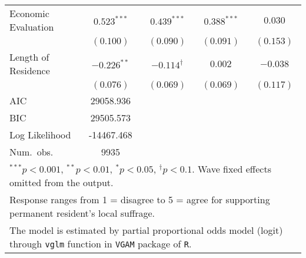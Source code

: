 \begin{table}
\begin{center}
\begin{tabular}{l c c c c }
Economic Evaluation    & $0.523^{***}$  & $0.439^{***}$      & $0.388^{***}$  & $0.030$            \\
                       & $(0.100)$      & $(0.090)$          & $(0.091)$      & $(0.153)$          \\
Length of Residence    & $-0.226^{**}$  & $-0.114^{\dagger}$ & $0.002$        & $-0.038$           \\
                       & $(0.076)$      & $(0.069)$          & $(0.069)$      & $(0.117)$          \\
\midrule
AIC                    & 29058.936      &                    &                &                    \\
BIC                    & 29505.573      &                    &                &                    \\
Log Likelihood         & -14467.468     &                    &                &                    \\
Num.\ obs.             & 9935           &                    &                &                    \\
\bottomrule
\multicolumn{5}{l}{\scriptsize{$^{***}p<0.001$, $^{**}p<0.01$, $^*p<0.05$, $^{\dagger}p<0.1$. Wave fixed effects omitted from the output.}} \\ \multicolumn{5}{l}{\scriptsize{Response ranges from 1 = disagree to 5 = agree for supporting permanent resident's local suffrage.}} \\ \multicolumn{5}{l}{\scriptsize{The model is estimated by partial proportional odds model (logit) through \texttt{vglm} function in \texttt{VGAM} package of \texttt{R}.}}
\end{tabular}
\label{goltab_smof}
\end{center}
\end{table}

